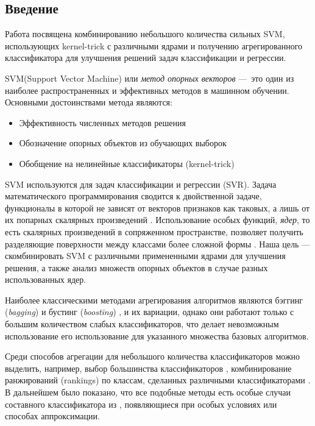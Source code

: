 \documentclass[a4paper, 10pt]{article}
\begin{document}
    \begin{multicols}{2}

\section*{Введение}
	
	Работа посвящена комбинированию небольшого количества сильных SVM, использующих kernel-trick с различными ядрами и получению агрегированного классификатора для улучшения решений задач классификации и регрессии. 
	
	
	SVM(Support Vector Machine) или \emph{метод опорных векторов}\cite{Vapnik1998}\cite{Cortes1995} \cite{Boser1992} ---~это один из наиболее распространенных и эффективных методов в машинном обучении. Основными достоинствами метода являются: 
		\begin{itemize}
			\item Эффективность численных методов решения
			\item Обозначение опорных объектов из обучающих выборок
			\item Обобщение на нелинейные классификаторы (kernel-trick)
		\end{itemize}
	SVM используются для задач классификации и регрессии (SVR). Задача математического программирования сводится к двойственной задаче, функционалы в которой не зависят от векторов признаков как таковых, а лишь от их попарных скалярных произведений \cite{Voron} . Использование особых функций, \emph{ядер}, то есть скалярных произведений в сопряженном пространстве, позволяет получить разделяющие поверхности между классами более сложной формы \cite{Smola2004}. Наша цель --- скомбинировать SVM
	с различными примененными ядрами для улучшения решения, а также анализ множеств опорных объектов в случае разных использованных ядер.
	
	
	Наиболее классическими методами агрегирования алгоритмов являются 
	бэггинг (\emph{bagging})\cite{Breiman1996} и бустинг (\emph{boosting}) \cite{Freund1995}, и их
	вариации, однако они работают только с  большим количеством слабых классификаторов, что делает невозможным использование его использование для указанного множества базовых алгоритмов.
	
	Среди способов агрегации для небольшого количества классификаторов можно
	выделить, например, выбор большинства классификаторов \cite{Franke1992}, 
	комбинирование ранжирований (rankings) по классам, сделанных различными
	классификаторами \cite{Ho1994}. В дальнейшем было показано, что все подобные 
	методы есть особые случаи составного классификатора из \cite{Kittler1996}, 
	появляющиеся при особых условиях или способах аппроксимации.
	

\end{multicols}
\end{document}
